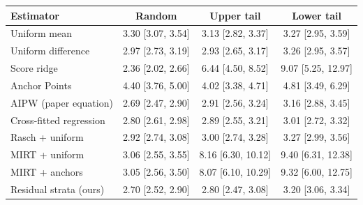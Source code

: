 \begin{tabular}{lccc}
\toprule
Estimator & Random & Upper tail & Lower tail \\
\midrule
Uniform mean & 3.30 [3.07, 3.54] & 3.13 [2.82, 3.37] & 3.27 [2.95, 3.59] \\
Uniform difference & 2.97 [2.73, 3.19] & 2.93 [2.65, 3.17] & 3.26 [2.95, 3.57] \\
Score ridge & 2.36 [2.02, 2.66] & 6.44 [4.50, 8.52] & 9.07 [5.25, 12.97] \\
Anchor Points & 4.40 [3.76, 5.00] & 4.02 [3.38, 4.71] & 4.81 [3.49, 6.29] \\
AIPW (paper equation) & 2.69 [2.47, 2.90] & 2.91 [2.56, 3.24] & 3.16 [2.88, 3.45] \\
Cross-fitted regression & 2.80 [2.61, 2.98] & 2.89 [2.55, 3.21] & 3.01 [2.72, 3.32] \\
Rasch + uniform & 2.92 [2.74, 3.08] & 3.00 [2.74, 3.28] & 3.27 [2.99, 3.56] \\
MIRT + uniform & 3.06 [2.55, 3.55] & 8.16 [6.30, 10.12] & 9.40 [6.31, 12.38] \\
MIRT + anchors & 3.05 [2.56, 3.50] & 8.07 [6.10, 10.29] & 9.32 [6.00, 12.75] \\
Residual strata (ours) & 2.70 [2.52, 2.90] & 2.80 [2.47, 3.08] & 3.20 [3.06, 3.34] \\
\bottomrule
\end{tabular}
